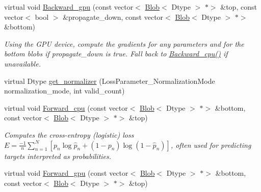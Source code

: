 \begin{DoxyCompactItemize}
\mbox{\label{classcaffe_1_1_sigmoid_cross_entropy_loss_layer_a3e1aa9138092aad788dc72fef27041f2}} 
virtual void \mbox{\hyperlink{classcaffe_1_1_sigmoid_cross_entropy_loss_layer_a3e1aa9138092aad788dc72fef27041f2}{Backward\+\_\+gpu}} (const vector$<$ \mbox{\hyperlink{classcaffe_1_1_blob}{Blob}}$<$ Dtype $>$ $\ast$$>$ \&top, const vector$<$ bool $>$ \&propagate\+\_\+down, const vector$<$ \mbox{\hyperlink{classcaffe_1_1_blob}{Blob}}$<$ Dtype $>$ $\ast$$>$ \&bottom)
\begin{DoxyCompactList}\small\item\em Using the G\+PU device, compute the gradients for any parameters and for the bottom blobs if propagate\+\_\+down is true. Fall back to \mbox{\hyperlink{classcaffe_1_1_sigmoid_cross_entropy_loss_layer_a025360b1de1fefbc4684e43603394a22}{Backward\+\_\+cpu()}} if unavailable. \end{DoxyCompactList}\item 
virtual Dtype \mbox{\hyperlink{classcaffe_1_1_sigmoid_cross_entropy_loss_layer_af8ce9b84227c0be01d4a1cc248a7aa52}{get\+\_\+normalizer}} (Loss\+Parameter\+\_\+\+Normalization\+Mode normalization\+\_\+mode, int valid\+\_\+count)
\item 
virtual void \mbox{\hyperlink{classcaffe_1_1_sigmoid_cross_entropy_loss_layer_ac4530f8bfb0349021c10cea856d2348b}{Forward\+\_\+cpu}} (const vector$<$ \mbox{\hyperlink{classcaffe_1_1_blob}{Blob}}$<$ Dtype $>$ $\ast$$>$ \&bottom, const vector$<$ \mbox{\hyperlink{classcaffe_1_1_blob}{Blob}}$<$ Dtype $>$ $\ast$$>$ \&top)
\begin{DoxyCompactList}\small\item\em Computes the cross-\/entropy (logistic) loss $ E = \frac{-1}{n} \sum\limits_{n=1}^N \left[ p_n \log \hat{p}_n + (1 - p_n) \log(1 - \hat{p}_n) \right] $, often used for predicting targets interpreted as probabilities. \end{DoxyCompactList}\item 
\mbox{\label{classcaffe_1_1_sigmoid_cross_entropy_loss_layer_a3a973821a2a73fd8bf4c2e474b2ad5d8}} 
virtual void \mbox{\hyperlink{classcaffe_1_1_sigmoid_cross_entropy_loss_layer_a3a973821a2a73fd8bf4c2e474b2ad5d8}{Forward\+\_\+gpu}} (const vector$<$ \mbox{\hyperlink{classcaffe_1_1_blob}{Blob}}$<$ Dtype $>$ $\ast$$>$ \&bottom, const vector$<$ \mbox{\hyperlink{classcaffe_1_1_blob}{Blob}}$<$ Dtype $>$ $\ast$$>$ \&top)

\end{DoxyCompactItemize}
